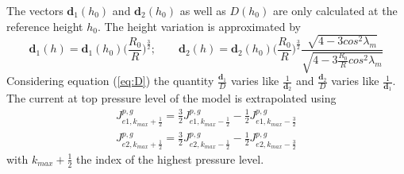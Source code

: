 %
The vectors $\mathbf{d}_{1}(h_0)$ and $\mathbf{d}_{2}(h_0)$ as well as $D(h_0)$ are only 
calculated at the reference height $h_0$. The
height variation is approximated by
%
\begin{equation}
    \mathbf{d}_1(h) = \mathbf{d}_{1}(h_0) \biggl( \frac{R_0}{R} \biggr)^{\frac{3}{2}}; \quad\quad
    \mathbf{d}_2(h) = \mathbf{d}_{2}(h_0) \biggl( \frac{R_0}{R} \biggr)^{\frac{3}{2}} 
            \frac{\sqrt{4-3 cos^2 \lambda_m}}{\sqrt{4-3 \frac{R_0}{R} cos^2 \lambda_m}}
\end{equation}
%
Considering equation (\ref{eq:D}) the quantity $\frac{\mathbf{d}_1}{D}$ varies like $\frac{1}{\mathbf{d}_2}$ and 
$\frac{\mathbf{d}_2}{D}$ varies like $\frac{1}{\mathbf{d}_1}$.
%
The current at top pressure level of the model is extrapolated using
%
\begin{gather}
  {J}_{e1,k_{max}+\frac{1}{2}}^{p,g} =\frac{3}{2} {J}_{e1,k_{max}-\frac{1}{2}}^{p,g} - \frac{1}{2}{J}_{e1,k_{max}-\frac{3}{2}}^{p,g} \\
  {J}_{e2,k_{max}+\frac{1}{2}}^{p,g} =\frac{3}{2} {J}_{e2,k_{max}-\frac{1}{2}}^{p,g} - \frac{1}{2}{J}_{e2,k_{max}-\frac{3}{2}}^{p,g}	
\end{gather}
%
with $k_{max}+\frac{1}{2}$ the index of the highest pressure level.
%
